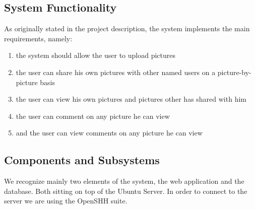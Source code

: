 \documentclass{article}
\begin{document}
\subsection{System Functionality}

As originally stated in the project description, the system implements the main requirements, namely:

\begin{enumerate}
\item the system should allow the user to upload pictures 
\item the user can share his own pictures with other named users on a picture-by-picture basis
\item the user can view his own pictures and pictures other has shared with him
\item the user can comment on any picture he can view
\item and the user can view comments on any picture he can view  
\end{enumerate}


\subsection{Components and Subsystems}

We recognize mainly two elements of the system, the web application  and the database. Both sitting on top of the Ubuntu Server. In order to connect to the server we are using the OpenSHH suite.
  
\end{document}
